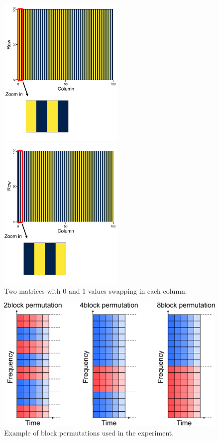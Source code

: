 \begin{figure}[htbp]
    \begin{minipage}[b]{0.45\linewidth}
      \centering
      \includegraphics[keepaspectratio, width=6.0cm]{figures/origi_spec/stripe1.pdf}
    \end{minipage}
    \begin{minipage}[b]{0.45\linewidth}
      \centering
      \includegraphics[keepaspectratio, width=6.0cm]{figures/origi_spec/stripe2.pdf}
    \end{minipage}
    \caption{Two matrices with 0 and 1 values swapping in each column.}
    \label{fig:stripe_spec}
\end{figure}

\begin{figure}[t]
    \begin{center}
        \includegraphics[width=1.0\columnwidth]{figures/experiment_block_matrix.pdf}
    \end{center}
	\caption{Example of block permutations used in the experiment.}
	\label{fig:ex_block}
\end{figure}

